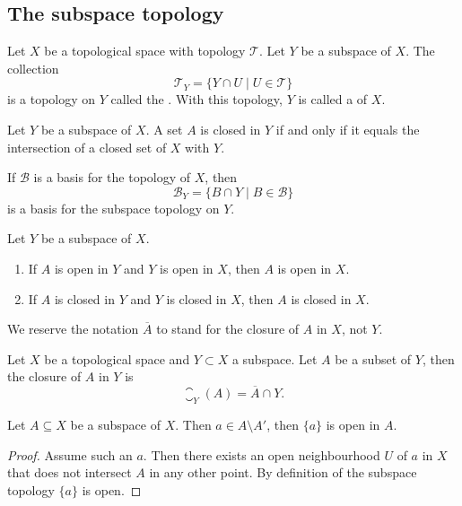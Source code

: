 \subsection{The subspace topology}
\begin{definition}
Let $X$ be a topological space with topology $\mathcal{T}$. Let $Y$ be a subspace of $X$. The collection
\[ \mathcal{T}_Y = \{ Y\cap U\;|\; U\in \mathcal{T} \} \]
is a topology on $Y$ called the . With this topology, $Y$ is called a  of $X$.
\end{definition}
\begin{lemma}
Let $Y$ be a subspace of $X$. A set $A$ is closed in $Y$ \textup{if and only if} it equals the intersection of a closed set of $X$ with $Y$.
\end{lemma}

\begin{lemma}
If $\mathcal{B}$ is a basis for the topology of $X$, then
\[\mathcal{B}_Y = \{ B\cap Y \;|\; B\in \mathcal{B} \}\]
is a basis for the subspace topology on $Y$.
\end{lemma}

\begin{lemma}
Let $Y$ be a subspace of $X$.
\begin{enumerate}
\item If $A$ is open in $Y$ and $Y$ is open in $X$, then $A$ is open in $X$.
\item If $A$ is closed in $Y$ and $Y$ is closed in $X$, then $A$ is closed in $X$.
\end{enumerate}
\end{lemma}
 
We reserve the notation $\overline{A}$ to stand for the closure of $A$ in $X$, not $Y$.
\begin{lemma} \label{subspaceClosure}
Let $X$ be a topological space and $Y\subset X$ a subspace. Let $A$ be a subset of $Y$, then the closure of $A$ in $Y$ is
\[ \closure_Y(A) = \overline{A}\cap Y.  \]
\end{lemma}

\begin{lemma} \label{notLimitPointSingletonOpen}
Let $A\subseteq X$ be a subspace of $X$. Then $a\in A\setminus A'$, then $\{a\}$ is open in $A$.
\end{lemma}
\begin{proof}
Assume such an $a$. Then there exists an open neighbourhood $U$ of $a$ in $X$ that does not intersect $A$ in any other point. By definition of the subspace topology $\{a\}$ is open.
\end{proof}

